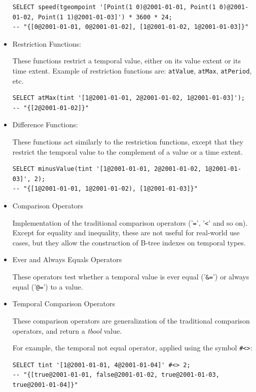 \begin{itemize}
        \begin{lstlisting}
SELECT speed(tgeompoint '[Point(1 0)@2001-01-01, Point(1 0)@2001-01-02, Point(1 1)@2001-01-03]') * 3600 * 24;
-- "{[0@2001-01-01, 0@2001-01-02], [1@2001-01-02, 1@2001-01-03]}"
        \end{lstlisting}

    \item Restriction Functions:

        These functions restrict a temporal value, either on its value extent or its time extent.
        Example of restriction functions are: \lstinline{atValue}, \lstinline{atMax}, \lstinline{atPeriod}, etc.

        \begin{lstlisting}
SELECT atMax(tint '[1@2001-01-01, 2@2001-01-02, 1@2001-01-03]');
-- "{[2@2001-01-02]}"
        \end{lstlisting}

    \item Difference Functions:

        These functions act similarly to the restriction functions, except that they restrict the temporal value to the complement of a value or a time extent.

        \begin{lstlisting}
SELECT minusValue(tint '[1@2001-01-01, 2@2001-01-02, 1@2001-01-03]', 2);
-- "{[1@2001-01-01, 1@2001-01-02), [1@2001-01-03]}"
        \end{lstlisting}

    \item Comparison Operators

        Implementation of the traditional comparison operators ('\lstinline+=+', '\lstinline+<+' and so on). Except for equality and inequality, these are not useful for real-world use cases, but they allow the construction of B-tree indexes on temporal types. 

    \item Ever and Always Equals Operators

        These operators test whether a temporal value is ever equal ('\lstinline+&=+') or always equal ('\lstinline+@=+') to a value.

    \item Temporal Comparison Operators

        These comparison operators are generalization of the traditional comparison operators, and return a \textit{tbool} value.

        For example, the temporal not equal operator, applied using the symbol \lstinline{#<>}:
        \begin{lstlisting}
SELECT tint '[1@2001-01-01, 4@2001-01-04]' #<> 2;
-- "{[true@2001-01-01, false@2001-01-02, true@2001-01-03, true@2001-01-04]}"
        \end{lstlisting}


\end{itemize}
